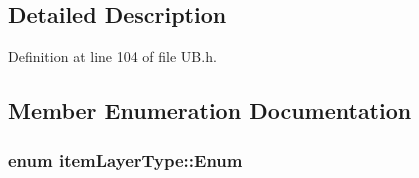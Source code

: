 \subsection{Detailed Description}


Definition at line 104 of file U\-B.\-h.



\subsection{Member Enumeration Documentation}
\hypertarget{structitem_layer_type_a94572e74aaa23902038cf97f28ec5a4d}{
\subsubsection[{Enum}]{\setlength{\rightskip}{0pt plus 5cm}enum {\bf item\-Layer\-Type\-::\-Enum}}}\label{dc/d14/structitem_layer_type_a94572e74aaa23902038cf97f28ec5a4d}
